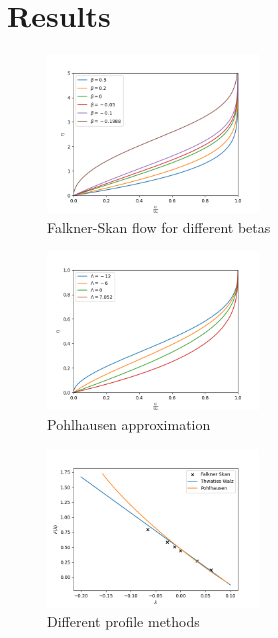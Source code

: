 \documentclass[conf]{new-aiaa}
\begin{document}
\section{Results}
\begin{figure}[H]
    \centering
    \includegraphics[width=0.5\textwidth]{Project 2.png}
    \caption{Falkner-Skan flow for different betas}
    \label{fig:Falkner-Skan for different betas}
\end{figure}

\begin{figure}[H]
    \centering
    \includegraphics[width=0.5\textwidth]{Pohlhausen.png}
    \caption{Pohlhausen approximation}
    \label{fig:Falkner-Skan}
\end{figure}

\begin{center}
    \resizebox{0.40\linewidth}{!}{}\label{tab:table1}
\end{center}

\begin{figure}[H]
    \centering
    \includegraphics[width=0.5\textwidth]{Thwaites Walz.png}
    \caption{Different profile methods}
    \label{fig:multiple profiles}
\end{figure}
\end{document}
